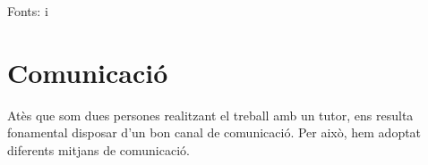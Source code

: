 Fonts:\cite{Comparacionsentrecontroldeversions} i \cite{blocdecriticad'undesenvolupador}

\section{Comunicació} \label{sec:4.1}

Atès que som dues persones realitzant el treball amb un tutor, ens resulta fonamental disposar d'un bon canal de comunicació. Per això, hem adoptat diferents mitjans de comunicació.

